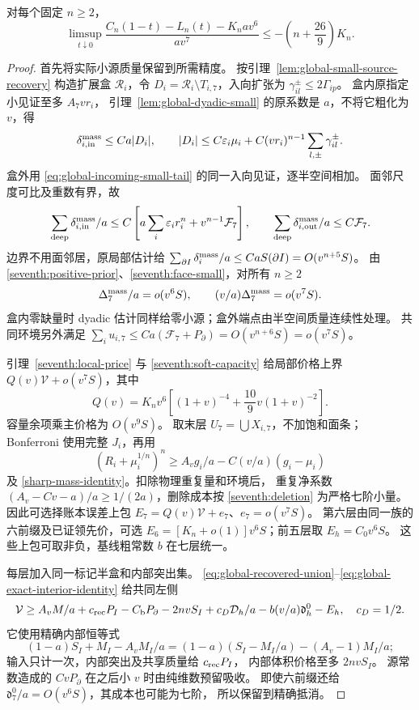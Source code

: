 \begin{proposition}[七阶上界]\label{seventh:upper}
对每个固定 \(n\ge2\)，
\[
 \limsup_{t\downarrow0}
 \frac{C_n(1-t)-L_n(t)-K_nav^6}{av^7}
 \le-\left(n+\frac{26}{9}\right)K_n.
\]
\end{proposition}
\begin{proof}
首先将实际小源质量保留到所需精度。
按引理~\ref{lem:global-small-source-recovery} 构造扩展盒
\(\mathcal R_i\)，令 \(D_i=\mathcal R_i\setminus T_{i,7}\)，入向扩张为
\(\gamma_{il}^{\pm}\le2\Gamma_{ip}\)。
盒内原指定小见证至多 \(A_7vr_i\)，
引理~\ref{lem:global-dyadic-small} 的原系数是 \(a\)，不将它粗化为 \(v\)，得
\[
 \delta_{i,\rm in}^{\rm mass}\le Ca|D_i|,\qquad
 |D_i|\le C\varepsilon_i\mu_i+
 C(vr_i)^{n-1}\sum_{l,\pm}\gamma_{il}^{\pm}.
\]
盒外用 \eqref{eq:global-incoming-small-tail} 的同一入向见证，逐半空间相加。
面邻尺度可比及重数有界，故
\[
 \sum_{\rm deep}\delta_{i,\rm in}^{\rm mass}/a
 \le C\left[a\sum_i\varepsilon_i r_i^n+v^{n-1}\mathcal F_7\right],
 \qquad
 \sum_{\rm deep}\delta_{i,\rm out}^{\rm mass}/a\le C\mathcal F_7.
\]
边界不用面邻居，原局部估计给
\(\sum_{\partial I}\delta_i^{\rm mass}/a\le CaS(\partial I)=O(v^{n+5}S)\)。
由 \eqref{seventh:positive-prior}、\eqref{seventh:face-small}，对所有 \(n\ge2\)
\begin{equation}\label{seventh:deletion}
 \Delta_7^{\rm mass}/a=o(v^6S),\qquad
 (v/a)\Delta_7^{\rm mass}=o(v^7S).
\end{equation}
盒内零缺量时 dyadic 估计同样给零小源；盒外端点由半空间质量连续性处理。
共同环境另外满足
\(\sum_i u_{i,7}\le Ca(\mathcal F_7+P_\partial)=O(v^{n+6}S)=o(v^7S)\)。

引理~\ref{seventh:local-price} 与 \ref{seventh:soft-capacity}
给局部价格上界 \(Q(v)\mathcal V+o(v^7S)\)，其中
\[
 Q(v)=K_nv^6\left[(1+v)^{-4}+\frac{10}{9}v(1+v)^{-2}\right].
\]
容量余项乘主价格为 \(O(v^9S)\)。
取末层 \(U_7=\bigcup X_{i,7}\)，不加饱和面条；
Bonferroni 使用完整 \(J_i\)，再用
\[
 (R_i+\mu_i^{1/n})^n\ge A_vg_i/a-C(v/a)(g_i-\mu_i)
\]
及 \eqref{sharp-mass-identity}。扣除物理重复量和环境后，
重复净系数 \((A_v-Cv-a)/a\ge1/(2a)\)，删除成本按
\eqref{seventh:deletion} 为严格七阶小量。
因此可选择账本误差上包
\(E_7=Q(v)\mathcal V+e_7\)、\(e_7=o(v^7S)\)。
第六层由同一族的六前缀及已证领先价，可选
\(E_6=[K_n+o(1)]v^6S\)；前五层取 \(E_h=C_0v^6S\)。
这些上包可取非负，基线粗常数 \(b\) 在七层统一。

每层加入同一标记半盒和内部突出集。
\eqref{eq:global-recovered-union}--\eqref{eq:global-exact-interior-identity}
给共同左侧
\begin{equation}\label{seventh:ledger}
 \mathcal V\ge A_vM/a+c_{\rm rec}P_I-C_{\rm b}P_\partial-2nvS_I
 +c_D\mathcal D_h/a-b(v/a)\mathfrak d_h^0-E_h,\quad c_D=1/2.
\end{equation}
它使用精确内部恒等式
\[
 (1-a)S_I+M_I-A_vM_I/a
 =(1-a)(S_I-M_I/a)-(A_v-1)M_I/a;
\]
输入只计一次，内部突出及共享质量给 \(c_{\rm rec}P_I\)，
内部体积价格至多 \(2nvS_I\)。
源常数造成的 \(CvP_\partial\) 在之后小 \(v\) 时由纯维数预留吸收。
即使六前缀还给 \(\mathfrak d_7^0/a=O(v^6S)\)，其成本也可能为七阶，
所以保留到精确抵消。


\end{proof}
